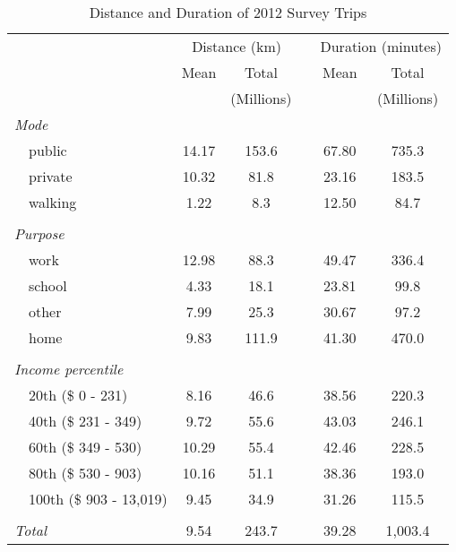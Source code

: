 \begin{table}[!htbp]
  \centering
  \caption{Distance and Duration of 2012 Survey Trips}
  \label{table:dist-and-dur}
    \begin{tabular}{llccccc}
    \toprule
    \toprule
      &   & \multicolumn{2}{c}{Distance (km)} &   & \multicolumn{2}{c}{Duration (minutes)} \\
\cmidrule{3-4}\cmidrule{6-7}      &   & Mean & Total &   & Mean & Total \\
      &   &   & (Millions) &   &   & (Millions) \\
    \midrule
    \multicolumn{2}{l}{\textit{Mode}} &   &   &   &   &  \\
      & public & 14.17 & 153.6 &   & 67.80 & 735.3 \\
      & private & 10.32 & 81.8 &   & 23.16 & 183.5 \\
      & walking & 1.22 & 8.3 &   & 12.50 & 84.7 \\
      &   &   &   &   &   &  \\
    \multicolumn{2}{l}{\textit{Purpose}} &   &   &   &   &  \\
      & work & 12.98 & 88.3 &   & 49.47 & 336.4 \\
      & school & 4.33 & 18.1 &   & 23.81 & 99.8 \\
      & other & 7.99 & 25.3 &   & 30.67 & 97.2 \\
      & home & 9.83 & 111.9 &   & 41.30 & 470.0 \\
      &   &   &   &   &   &  \\
    \multicolumn{2}{l}{\textit{Income percentile}} &   &   &   &   &  \\
      & 20th (\$ 0 - 231) & 8.16 & 46.6 &   & 38.56 & 220.3 \\
      & 40th (\$ 231 - 349) & 9.72 & 55.6 &   & 43.03 & 246.1 \\
      & 60th (\$ 349 - 530) & 10.29 & 55.4 &   & 42.46 & 228.5 \\
      & 80th (\$ 530 - 903) & 10.16 & 51.1 &   & 38.36 & 193.0 \\
      & 100th (\$ 903 - 13,019) & 9.45 & 34.9 &   & 31.26 & 115.5 \\
      &   &   &   &   &   &  \\
    \multicolumn{2}{l}{\textit{Total}} & 9.54 & 243.7 &   & 39.28 & 1,003.4 \\
    \bottomrule
    \bottomrule
    \end{tabular}%
  \label{tab:addlabel}%
\end{table}%
